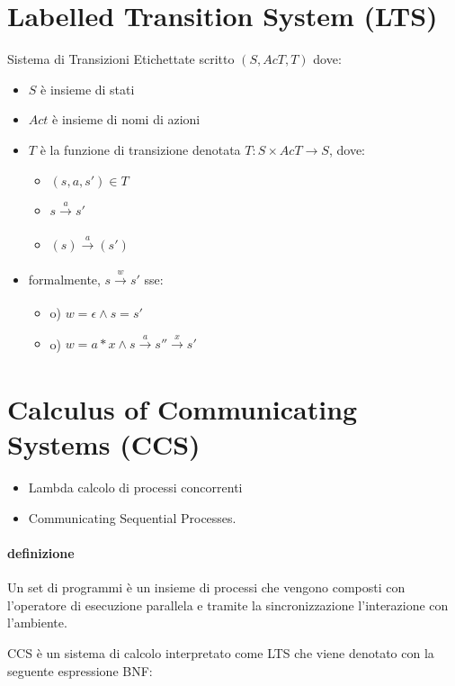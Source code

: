 \section{Labelled Transition System (LTS)}

Sistema di Transizioni Etichettate scritto $(S, AcT, T)$ dove:
\begin{itemize}
  \item $S$ \`e insieme di stati
  \item $Act$ \`e insieme di nomi di azioni
  \item $T$ \`e la funzione di transizione denotata $T: S \times AcT \rightarrow S$, dove:
    \begin{itemize}
      \item $(s, a, s') \in T$
      \item $s \xrightarrow[]{a} s'$
      \item $(s) \xrightarrow[]{a} (s')$
    \end{itemize}
  \item formalmente, $s \xrightarrow[]{w} s'$ sse:
  \begin{itemize}
    \item o) $w = \epsilon \land s = s'$
    \item o) $w = a*x \land s \xrightarrow[]{a} s'' \xrightarrow[]{x} s'$
  \end{itemize}
\end{itemize}

\section{Calculus of Communicating Systems (CCS)}

\begin{itemize}
  \item Lambda calcolo di processi concorrenti
  \item Communicating Sequential Processes.
\end{itemize}

\paragraph{definizione}
Un set di programmi \`e un insieme di processi che vengono composti con l'operatore di esecuzione parallela e tramite la sincronizzazione l'interazione con l'ambiente.

CCS \`e un sistema di calcolo interpretato come LTS che viene denotato con la seguente espressione BNF:

